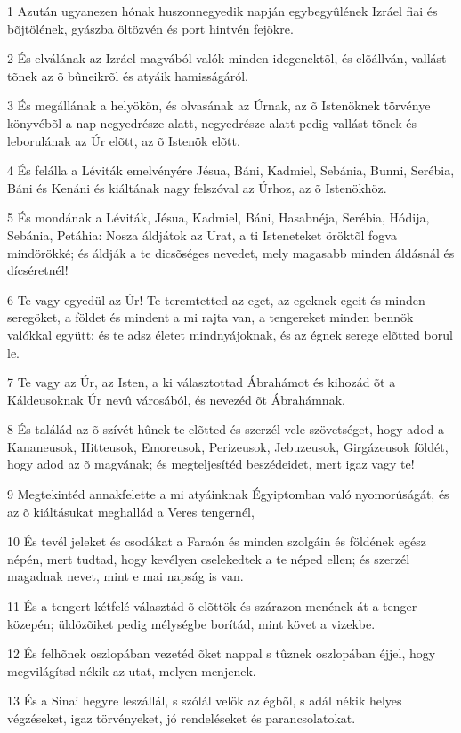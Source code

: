 \par 1 Azután ugyanezen hónak huszonnegyedik napján egybegyûlének Izráel fiai és bõjtölének, gyászba öltözvén és port hintvén fejökre.
\par 2 És elválának az Izráel magvából valók minden idegenektõl, és elõállván, vallást tõnek az õ bûneikrõl és atyáik hamisságáról.
\par 3 És megállának a helyökön, és olvasának az Úrnak, az õ Istenöknek törvénye könyvébõl a nap negyedrésze alatt, negyedrésze alatt pedig vallást tõnek és leborulának az Úr elõtt, az õ Istenök elõtt.
\par 4 És felálla a Léviták emelvényére Jésua, Báni, Kadmiel, Sebánia, Bunni, Serébia, Báni és Kenáni és kiáltának nagy felszóval az Úrhoz, az õ Istenökhöz.
\par 5 És mondának a Léviták, Jésua, Kadmiel, Báni, Hasabnéja, Serébia, Hódija, Sebánia, Petáhia: Nosza áldjátok az Urat, a ti Isteneteket öröktõl fogva mindörökké; és áldják a te dicsõséges nevedet, mely magasabb minden áldásnál és dícséretnél!
\par 6 Te vagy egyedül az Úr! Te teremtetted az eget, az egeknek egeit és minden seregöket, a földet és mindent a mi rajta van, a tengereket minden bennök valókkal együtt; és te adsz életet mindnyájoknak, és az égnek serege elõtted borul le.
\par 7 Te vagy az Úr, az Isten, a ki választottad Ábrahámot és kihozád õt a Káldeusoknak Úr nevû városából, és nevezéd õt Ábrahámnak.
\par 8 És találád az õ szívét hûnek te elõtted és szerzél vele szövetséget, hogy adod  a Kananeusok, Hitteusok, Emoreusok, Perizeusok, Jebuzeusok, Girgázeusok földét, hogy adod az õ magvának; és megteljesítéd beszédeidet, mert igaz vagy te!
\par 9 Megtekintéd annakfelette a mi atyáinknak Égyiptomban való nyomorúságát, és az õ kiáltásukat meghallád a Veres tengernél,
\par 10 És tevél jeleket és csodákat a Faraón és minden szolgáin és földének egész népén, mert tudtad, hogy kevélyen cselekedtek a te néped ellen; és szerzél magadnak nevet, mint e mai napság is van.
\par 11 És a tengert kétfelé választád õ elõttök és szárazon menének át a tenger közepén; üldözõiket pedig mélységbe borítád, mint követ a vizekbe.
\par 12 És felhõnek oszlopában vezetéd õket nappal s tûznek oszlopában éjjel, hogy megvilágítsd nékik az utat, melyen menjenek.
\par 13 És a Sinai hegyre leszállál, s szólál velök az égbõl, s adál nékik helyes végzéseket, igaz törvényeket, jó rendeléseket és parancsolatokat.
